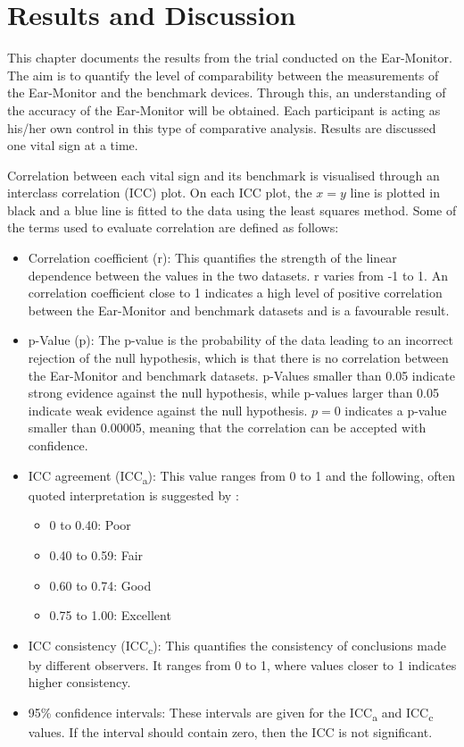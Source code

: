 \chapter{Results and Discussion}
\label{chp:Results and Discussion}
This chapter documents the results from the trial conducted on the Ear-Monitor. The aim is to quantify the level of comparability between the measurements of the Ear-Monitor and the benchmark devices. Through this, an understanding of the accuracy of the Ear-Monitor will be obtained. Each participant is acting as his/her own control in this type of comparative analysis. Results are discussed one vital sign at a time.

\medskip

Correlation between each vital sign and its benchmark is visualised through an interclass correlation (ICC) plot. On each ICC plot, the $x=y$ line is plotted in black and a blue line is fitted to the data using the least squares method. Some of the terms used to evaluate correlation are defined as follows:

\begin{itemize}
\item Correlation coefficient (r): This quantifies the strength of the linear dependence between the values in the two datasets. r varies from -1 to 1. An correlation coefficient close to 1 indicates a high level of positive correlation between the Ear-Monitor and benchmark datasets and is a favourable result.

\item p-Value (p): The p-value is the probability of the data leading to an incorrect rejection of the null hypothesis, which is that there is no correlation between the Ear-Monitor and benchmark datasets. p-Values smaller than 0.05 indicate strong evidence against the null hypothesis, while p-values larger than 0.05 indicate weak evidence against the null hypothesis. $p=0$ indicates a p-value smaller than 0.00005, meaning that the correlation can be accepted with confidence.

\item ICC agreement (ICC\textsubscript{a}): This value ranges from 0 to 1 and the following, often quoted interpretation is suggested by \cite{cicchetti1994guidelines}:
\begin{itemize}
\item 0 to 0.40: Poor
\item 0.40 to 0.59: Fair
\item 0.60 to 0.74: Good
\item 0.75 to 1.00: Excellent
\end{itemize}

\item ICC consistency (ICC\textsubscript{c}): This quantifies the consistency of conclusions made by different observers. It ranges from 0 to 1, where values closer to 1 indicates higher consistency.

\item 95\% confidence intervals: These intervals are given for the ICC\textsubscript{a} and  ICC\textsubscript{c} values. If the interval should contain zero, then the ICC is not significant.
\end{itemize}

